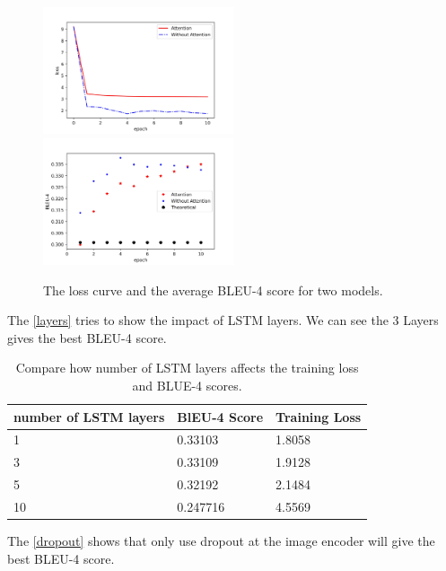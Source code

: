\documentclass[fleqn,10pt]{SelfArx} %
\begin{document}
\begin{figure}[H]
\centering
\includegraphics[width=0.5\textwidth]{loss.jpeg}
\includegraphics[width=0.5\textwidth]{bleu.jpeg}
\caption{The loss curve and the average BLEU-4 score for two models.}\label{fig:1}
\end{figure}

The \autoref{layers} tries to show the impact of LSTM layers. We can see the 3 Layers gives the best BLEU-4 score.


\begin{table}[H]
\begin{tabular}{lll}
\hline
number of LSTM layers & BlEU-4 Score & Training Loss \\ \hline
1                     & 0.33103      & 1.8058        \\ \hline
3                     & 0.33109      & 1.9128        \\ \hline
5                     & 0.32192      & 2.1484        \\ \hline
10                    & 0.247716     & 4.5569        \\ \hline
\end{tabular}
\caption{Compare how number of LSTM layers affects the training loss and BLUE-4 scores.}\label{layers}
\end{table}

The \autoref{dropout} shows that only use dropout at the image encoder will give the best BLEU-4 score.
\end{document}

